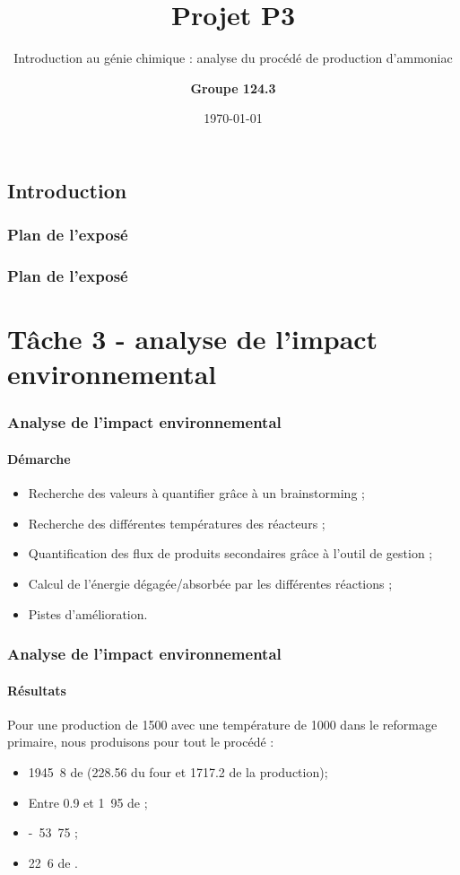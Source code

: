 \documentclass{beamer}
\title{Projet P3}
\subtitle{Introduction au génie chimique : analyse du procédé de production d'ammoniac}
\author{\textbf{Groupe 124.3}}
\institute{Ecole Polytechnique de Louvain}
\date{\today}
\begin{document}
 
 
	\begin{frame} 
		\titlepage 
	\end{frame} 
	
	\begin{frame}
		\section{Introduction}
		\frametitle{Plan de l'exposé}
		\tableofcontents[currentsubsection,sectionstyle=show/shaded,subsectionstyle=show/shaded/hide]
	\end{frame}
	
	\begin{frame}
		\frametitle{Plan de l'exposé}
		\section{Tâche 3 - analyse de l'impact environnemental}
		\tableofcontents[currentsubsection,sectionstyle=show/shaded,subsectionstyle=show/shaded/hide]
	\end{frame}
	
	\begin{frame}
	\frametitle{Analyse de l'impact environnemental}
	\framesubtitle{Démarche}
	\begin{itemize}
		\item Recherche des valeurs à quantifier grâce à un brainstorming ;
		\item Recherche des différentes températures des réacteurs ;
		\item Quantification des flux de produits secondaires grâce à l'outil de gestion ;
		\item Calcul de l'énergie dégagée/absorbée par les différentes réactions ;
		\item Pistes d'amélioration.
	\end{itemize}
	\end{frame}

	\begin{frame}
	\frametitle{Analyse de l'impact environnemental}
	\framesubtitle{Résultats}
	Pour une production de \unit{1500}{\ton\per\dday} avec une température 
	de \unit{1000}{\kelvin} dans le reformage primaire, nous produisons pour tout le procédé :
	\begin{itemize}
		\item \unit{1945.8}{\ton\per\dday} de  (228.56 du four et 1717.2 de la production);
		\item Entre 0.9 et \unit{1.95}{\ton\per\dday} de  ; \cite{nitrogen_issue}
		\item \unit{-53.75}{\kilo\joule\per\dday} ;
		\item \unit{22.6}{\ton\per\dday} de \chemform{Ar}.
	\end{itemize}
	\end{frame}
\end{document}
